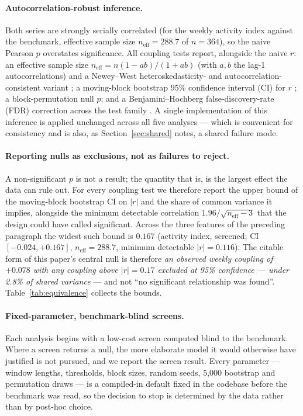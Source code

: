 \documentclass[11pt,a4paper]{article}
\begin{document}
\paragraph{Autocorrelation-robust inference.} Both series are strongly serially correlated (for
the weekly activity index against the benchmark, effective sample size $n_{\text{eff}}=288.7$
of $n=364$), so the naive Pearson $p$ overstates significance. All coupling tests report,
alongside the naive $r$: an effective sample size $n_{\text{eff}}=n(1-ab)/(1+ab)$ (with $a,b$ the
lag-1 autocorrelations) and a Newey--West heteroskedasticity- and autocorrelation-consistent
variant \citep{newey_west_1987}; a moving-block bootstrap 95\% confidence interval (CI) for $r$
\citep{kunsch_1989}; a block-permutation null $p$; and a Benjamini--Hochberg false-discovery-rate
(FDR) correction across the test family \citep{benjamini_hochberg_1995}. A single implementation of
this inference is applied unchanged across all five analyses --- which is convenient for
consistency and is also, as Section~\ref{sec:shared} notes, a shared failure mode.

\paragraph{Reporting nulls as exclusions, not as failures to reject.} A non-significant $p$ is not
a result; the quantity that is, is the largest effect the data can rule out. For every coupling
test we therefore report the upper bound of the moving-block bootstrap CI on $|r|$ and the share of
common variance it implies, alongside the minimum detectable correlation
$1.96/\sqrt{n_{\text{eff}}-3}$ that the design could have called significant. Across the three
features of the preceding paragraph the widest such bound is $0.167$ (activity index, screened;
CI $[-0.024,+0.167]$, $n_{\text{eff}}=288.7$, minimum detectable $|r|=0.116$). The citable form of
this paper's central null is therefore \emph{an observed weekly coupling of $+0.078$ with any
coupling above $|r|=0.17$ excluded at 95\% confidence --- under 2.8\% of shared variance} --- and
not ``no significant relationship was found''. Table~\ref{tab:equivalence} collects the bounds.

\paragraph{Fixed-parameter, benchmark-blind screens.} Each analysis begins with a low-cost screen
computed blind to the benchmark. Where a screen returns a null, the more elaborate model it would
otherwise have justified is not pursued, and we report the screen result. Every parameter ---
window lengths, thresholds, block sizes, random seeds, 5{,}000 bootstrap and permutation draws
--- is a compiled-in default fixed in the codebase before the benchmark was read, so the decision
to stop is determined by the data rather than by post-hoc choice.
\end{document}
